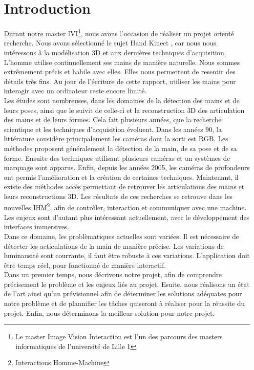 \chapter*{Introduction}

Durant notre master IVI\footnote{Le master Image Vision Interaction est 
l'un des parcours des masters informatiques de l'université de Lille 1}, 
nous avons l'occasion de réaliser un projet orienté recherche. Nous avons 
sélectionné le sujet \og Hand Kinect \fg, car nous nous intéressons à la 
modélisation 3D et aux dernières techniques d'acquisition. \\

L'homme utilise continuellement ses mains de manière naturelle. Nous 
sommes extrêmement précis et habile avec elles. Elles nous permettent 
de resentir des détails très fins. Au jour de l'écriture de cette rapport,
utiliser les mains pour interagir avec un ordinateur reste encore limité.\\

Les études sont nombreuses, dans les domaines de la détection des mains 
et de leurs poses, ainsi que le suivit de celle-ci et la reconstruction 
3D des articulation des mains et de leurs formes. Cela fait plusieurs années, 
que la recherche scientique et les techniques d'acquisition évoluent. 
Dans les années 90, la littérature considère principalement les caméras 
dont la sorti est RGB. Les méthodes proposent généralement la détection 
de la main, de sa pose et de sa forme. Ensuite des techniques utilisant 
plusieurs caméras et un systèmes de marquage sont apparus. Enfin, depuis 
les années 2005, les caméras de profondeurs ont permis l'amélioration 
et la création de certaines techniques. Maintenant, il existe des méthodes 
accès permettant de retrouver les articulations des mains et leurs 
reconstructions 3D. Les résultats de ces recherches se retrouve dans les 
nouvelles IHM\footnote{Interactions Homme-Machine}, afin de contrôler, 
interaction et communiquer avec une machine. Les enjeux sont d'autant plus 
intéressant actuellement, avec le développement des interfaces 
immersives.\\

Dans ce domaine, les problèmatiques actuelles sont variées. Il est 
nécessaire de détecter les acticulations de la main de manière précise. 
Les variations de luminausité sont courrante, il faut être robuste à 
ces variations. L'application doit être temps réel, pour fonctionné de 
manière interactif.\\


Dans un premier temps, nous décrivons notre projet, afin de comprendre 
précisement le problème et les enjeux liés au projet. Esuite, nous réalisons 
un état de l'art ainsi qu'un prévisionnel afin de déterminer les solutions 
adéquates pour notre problème et de plannifier les tâches quiseront à 
réaliser pour la réussite du projet. Enfin, nous déterminons la meilleur 
solution pour notre projet.


